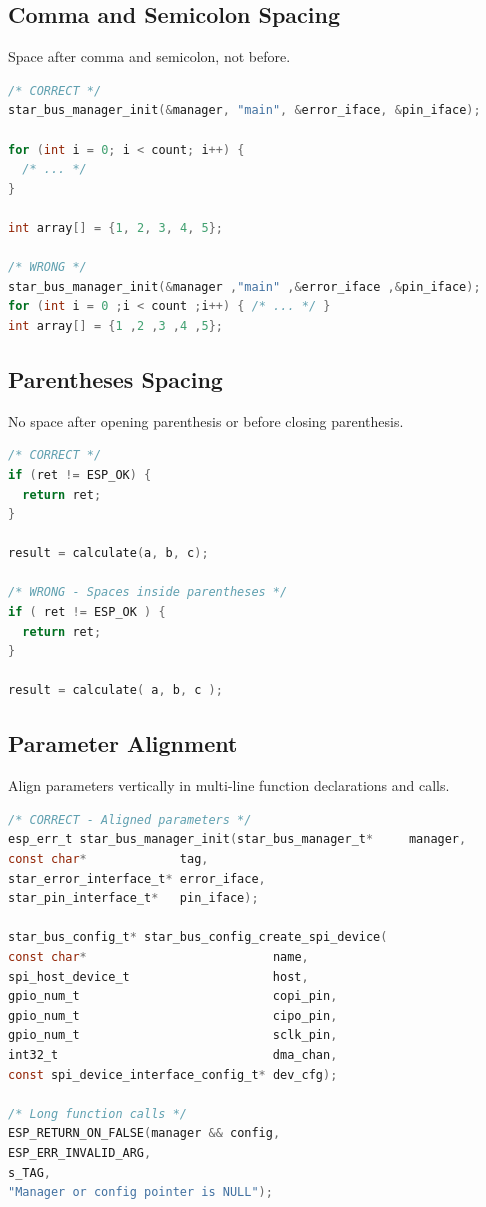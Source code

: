\subsection{Comma and Semicolon Spacing}

Space after comma and semicolon, not before.

\begin{lstlisting}[language=C]
/* CORRECT */
star_bus_manager_init(&manager, "main", &error_iface, &pin_iface);

for (int i = 0; i < count; i++) {
  /* ... */
}

int array[] = {1, 2, 3, 4, 5};

/* WRONG */
star_bus_manager_init(&manager ,"main" ,&error_iface ,&pin_iface);
for (int i = 0 ;i < count ;i++) { /* ... */ }
int array[] = {1 ,2 ,3 ,4 ,5};
\end{lstlisting}

\subsection{Parentheses Spacing}

No space after opening parenthesis or before closing parenthesis.

\begin{lstlisting}[language=C]
/* CORRECT */
if (ret != ESP_OK) {
  return ret;
}

result = calculate(a, b, c);

/* WRONG - Spaces inside parentheses */
if ( ret != ESP_OK ) {
  return ret;
}

result = calculate( a, b, c );
\end{lstlisting}

\subsection{Parameter Alignment}

Align parameters vertically in multi-line function declarations and calls.

\begin{lstlisting}[language=C]
/* CORRECT - Aligned parameters */
esp_err_t star_bus_manager_init(star_bus_manager_t*     manager,
const char*             tag,
star_error_interface_t* error_iface,
star_pin_interface_t*   pin_iface);

star_bus_config_t* star_bus_config_create_spi_device(
const char*                          name,
spi_host_device_t                    host,
gpio_num_t                           copi_pin,
gpio_num_t                           cipo_pin,
gpio_num_t                           sclk_pin,
int32_t                              dma_chan,
const spi_device_interface_config_t* dev_cfg);

/* Long function calls */
ESP_RETURN_ON_FALSE(manager && config,
ESP_ERR_INVALID_ARG,
s_TAG,
"Manager or config pointer is NULL");
\end{lstlisting}

